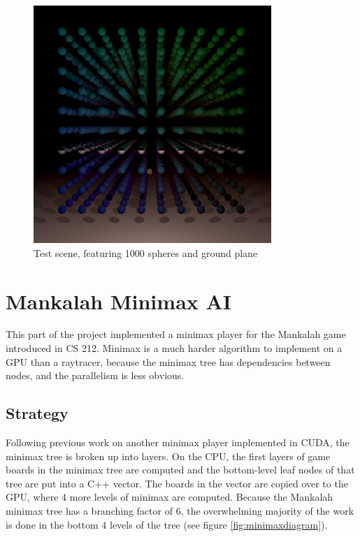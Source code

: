 \documentclass{article}
\begin{document}
\begin{figure}[ht!]
\centering
\includegraphics[width=90mm]{scene.png}
\caption{Test scene, featuring 1000 spheres and ground plane}
\label{fig:testscene}
\end{figure}

\section{Mankalah Minimax AI}
This part of the project implemented a minimax player for the Mankalah game introduced in CS 212. Minimax is a much harder algorithm to implement on a GPU than a raytracer, because the minimax tree has dependencies between nodes, and the parallelism is less obvious.

\subsection{Strategy}
Following previous work on another minimax player implemented in CUDA\cite{rockisuda10}, the minimax tree is broken up into layers. On the CPU, the first layers of game boards in the minimax tree are computed and the bottom-level leaf nodes of that tree are put into a C++ vector. The boards in the vector are copied over to the GPU, where 4 more levels of minimax are computed. Because the Mankalah minimax tree has a branching factor of 6, the overwhelming majority of the work is done in the bottom 4 levels of the tree (see figure \ref{fig:minimaxdiagram}).
\end{document}

